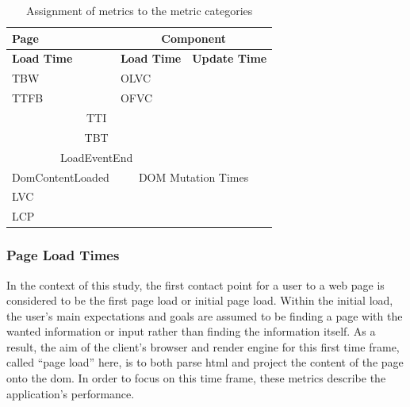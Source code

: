 \documentclass[a4paper, 12pt]{article}
\begin{document}
\begin{table}[h]
  \begin{center}
    \begin{tabular}[h]{|l|l|l|}
      \hline
      \multicolumn{1}{|l|}{\textbf{Page}}       & \multicolumn{2}{c|}{\textbf{Component}}     \\ \hline
      \multicolumn{1}{|l|}{\textbf{Load Time}}  & \textbf{Load Time}  & \textbf{Update Time}  \\ \hline
      TBW                                       & OLVC                &                       \\ \hline
      TTFB                                      & OFVC                &                       \\ \hline
      \multicolumn{2}{|c|}{TTI}                                       &                       \\ \hline
      \multicolumn{2}{|c|}{TBT}                                       &                       \\ \hline
      \multicolumn{2}{|c|}{LoadEventEnd}                              &                       \\ \hline
      DomContentLoaded                          & \multicolumn{2}{c|}{DOM Mutation Times}     \\ \hline
      LVC                                       &                               &             \\ \hline
      LCP                                       &                               &             \\ \hline
    \end{tabular}
  \end{center}
  \caption{Assignment of metrics to the metric categories}
  \label{tab:metriccategories}
\end{table}

\subsubsection{Page Load Times}\label{subsubsec:pageloadtimes}

In the context of this study, the first contact point for a user to a web page is considered to be the first page load or initial page load.
Within the initial load, the user's main expectations and goals are assumed to be finding a page with the wanted information or input rather than finding the information itself.
As a result, the aim of the client's browser and render engine for this first time frame, called \enquote{page load} here, is to both parse \acrshort{html} and project the content of the page onto the \acrshort{dom}.
In order to focus on this time frame, these metrics describe the application's performance.
\end{document}
